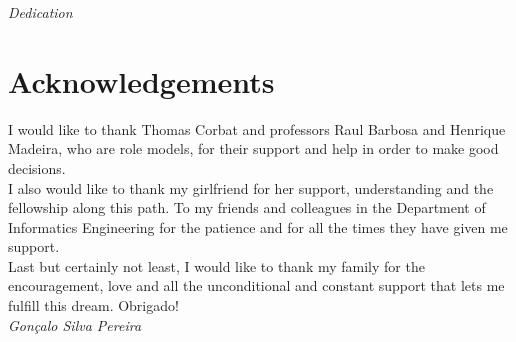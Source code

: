 
\pagestyle{empty}
\begin{center}

\emph{Dedication}

\end{center}

\clearpage
\section*{Acknowledgements}

I would like to thank Thomas Corbat and professors Raul Barbosa and Henrique Madeira, who are role models, for their support and help in order to make good decisions.\\

I also would like to thank my girlfriend for her support, understanding and the fellowship along this path. To my friends and colleagues in the Department of Informatics Engineering for the patience and for all the times they have given me support. \\

Last but certainly not least, I would like to thank my family for the encouragement, love and all the unconditional and constant support that lets me fulfill this dream. Obrigado!\\



\emph{\hfill Gonçalo Silva Pereira}

\clearpage

\vspace*{\fill}
\pagestyle{empty}


